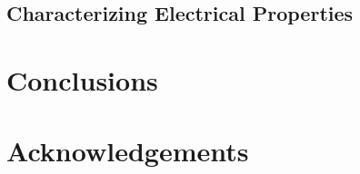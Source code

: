 \documentclass[12pt]{article}
\begin{document}
 





\pagebreak
\subsection{Characterizing Electrical Properties}

\section{Conclusions}






\section{Acknowledgements}







\newpage
\printbibliography[heading=subbibintoc]
%
%
\end{document}
